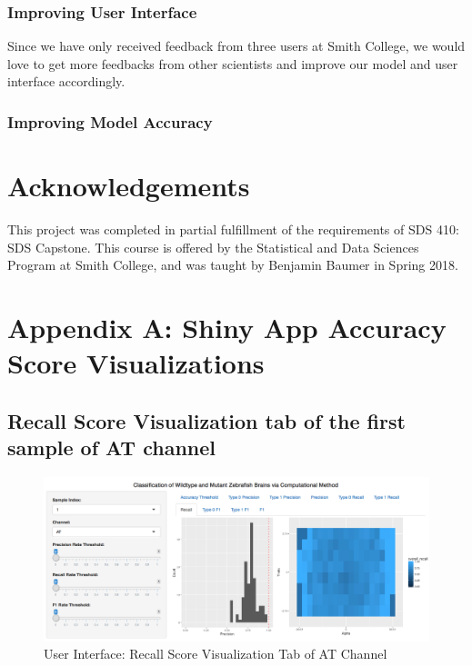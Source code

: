 \documentclass[10pt,letterpaper]{article}
\begin{document}
\subsubsection{Improving User Interface}\label{improving-user-interface}

Since we have only received feedback from three users at Smith College,
we would love to get more feedbacks from other scientists and improve
our model and user interface accordingly.

\subsubsection{Improving Model Accuracy}\label{improving-model-accuracy}

\section{Acknowledgements}\label{acknowledgements}

This project was completed in partial fulfillment of the requirements of
SDS 410: SDS Capstone. This course is offered by the Statistical and
Data Sciences Program at Smith College, and was taught by Benjamin
Baumer in Spring 2018.

\newpage

\section{Appendix A: Shiny App Accuracy Score
Visualizations}\label{appendix-a-shiny-app-accuracy-score-visualizations}

\subsection{Recall Score Visualization tab of the first sample of AT
channel}\label{recall-score-visualization-tab-of-the-first-sample-of-at-channel}

\begin{figure}[h]

{\centering \includegraphics[width=4.91in]{figures/shiny4} 

}

\caption{User Interface: Recall Score Visualization Tab of AT Channel}\label{fig:shiny4}
\end{figure}
\end{document}
